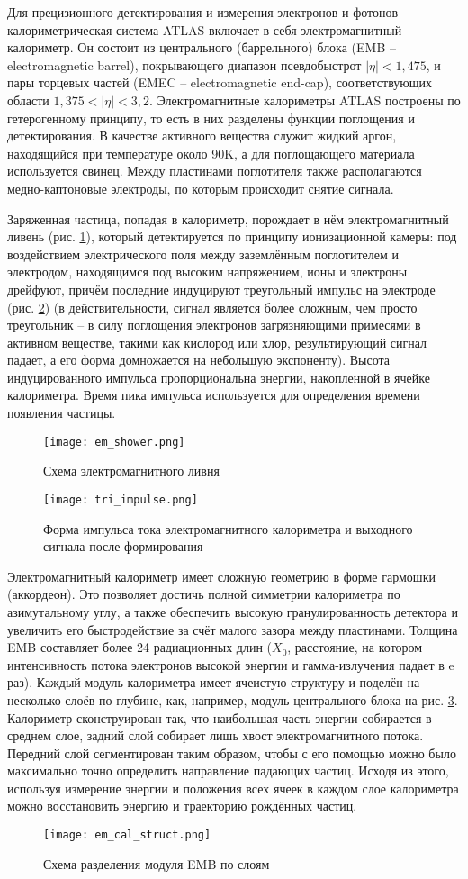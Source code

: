 Для прецизионного детектирования и измерения электронов и фотонов калориметрическая система ATLAS включает в себя электромагнитный калориметр. Он состоит из центрального (баррельного) блока (EMB -- electromagnetic barrel), покрывающего диапазон псевдобыстрот $|\eta| < 1,475$, и пары торцевых частей (EMEC -- electromagnetic end-cap), соответствующих области $1,375 < |\eta| < 3,2$. Электромагнитные калориметры ATLAS построены по гетерогенному принципу, то есть в них разделены функции поглощения и детектирования. В качестве активного вещества служит жидкий аргон, находящийся при температуре около 90K, а для поглощающего материала используется свинец. Между пластинами поглотителя также располагаются медно-каптоновые электроды, по которым происходит снятие сигнала.\par
Заряженная частица, попадая в калориметр, порождает в нём электромагнитный ливень (рис. \ref{fig:em_shower})\parencite{em_shower_wiki}, который детектируется по принципу ионизационной камеры: под воздействием электрического поля между заземлённым поглотителем и электродом, находящимся под высоким напряжением, ионы и электроны дрейфуют, причём последние индуцируют треугольный импульс на электроде (рис. \ref{fig:tri_impulse}) (в действительности, сигнал является более сложным, чем просто треугольник -- в силу поглощения электронов загрязняющими примесями в активном веществе, такими как кислород или хлор, результирующий сигнал падает, а его форма домножается на небольшую экспоненту). Высота индуцированного импульса пропорциональна энергии, накопленной в ячейке калориметра. Время пика импульса используется для определения времени появления частицы.\par
\begin{figure}[ht]
    \centering
    \texttt{[image: em\_shower.png]}
    \caption{Схема электромагнитного ливня}
    \label{fig:em_shower}
\end{figure}
\begin{figure}[ht]
    \centering
    \texttt{[image: tri\_impulse.png]}
    \caption{Форма импульса тока электромагнитного калориметра и выходного сигнала после формирования}
    \label{fig:tri_impulse}
\end{figure}
Электромагнитный калориметр имеет сложную геометрию в форме гармошки (аккордеон). Это позволяет достичь полной симметрии калориметра по азимутальному углу, а также обеспечить высокую гранулированность детектора и увеличить его быстродействие за счёт малого зазора между пластинами. Толщина EMB составляет более 24 радиационных длин ($X_0$, расстояние, на котором интенсивность потока электронов высокой энергии и гамма-излучения падает в e раз). Каждый модуль калориметра имеет ячеистую структуру и поделён на несколько слоёв по глубине, как, например, модуль центрального блока на рис. \ref{fig:em_cal_struct}. Калориметр сконструирован так, что наибольшая часть энергии собирается в среднем слое, задний слой собирает лишь хвост электромагнитного потока. Передний слой сегментирован таким образом, чтобы с его помощью можно было максимально точно определить направление падающих частиц. Исходя из этого, используя измерение энергии и положения всех ячеек в каждом слое калориметра можно восстановить энергию и траекторию рождённых частиц.
\begin{figure}[ht]
    \centering
    \texttt{[image: em\_cal\_struct.png]}
    \caption{Схема разделения модуля EMB по слоям}
    \label{fig:em_cal_struct}
\end{figure}

